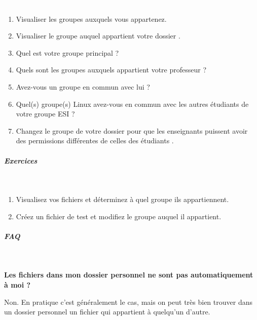 \documentclass[11pt,a4paper]{article}
\begin{document}
					\textcolor{white}{.} \par
				
            \par
        
					\begin{enumerate}
				
			\item Visualiser les groupes auxquels vous appartenez.
			\item Visualiser le groupe auquel appartient votre dossier \verb@tdLinux@.
			\item Quel est votre groupe principal ? 
			\item Quels sont les groupes auxquels appartient votre professeur ?
			\item Avez-vous un groupe en commun avec lui ?
			\item Quel(s) groupe(s) Linux avez-vous en commun avec les autres \'etudiants de votre groupe ESI ?
			\item Changez le groupe de  votre dossier \verb@tdLinux@ 
					pour que les enseignants puissent avoir des permissions diff\'erentes de celles des \'etudiants .
					\end{enumerate}
				
			
		\subparagraph{Exercices} 
		
					\textcolor{white}{.} \par
				
            \par
        
					\begin{enumerate}
				
			\item Visualisez vos fichiers et d\'eterminez \`a quel groupe ils appartiennent.
			\item Cr\'eez un fichier de test et modifiez le groupe auquel il appartient.
					\end{enumerate}
				
			
		\subparagraph{FAQ} 
		
					\textcolor{white}{.} \par
				
            \par
        \textbf{Les fichiers dans mon dossier personnel ne sont pas automatiquement \`a moi ?}
            \par
          
					Non. En pratique c'est g\'en\'eralement le cas, 
					mais on peut tr\`es bien trouver dans un dossier personnel un fichier qui appartient \`a quelqu'un d'autre.  
				
\end{document}
